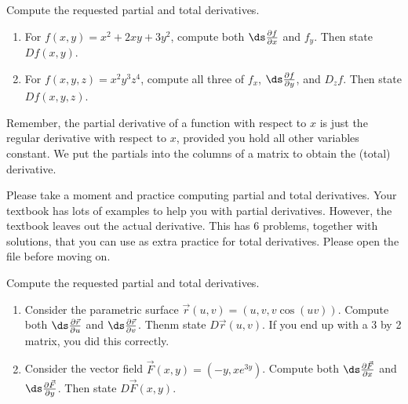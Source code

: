 \begin{problem}
%
Compute the requested partial and total derivatives.
\begin{enumerate}
 \item  For $f(x,y)=x^2+2xy+3y^2$, compute both $\ds\frac{\partial f}{\partial x}$ and $f_y$. Then state $Df(x,y)$. 
 \item  For $f(x,y,z)=x^2y^3z^4$, compute all three of $f_x$, $\ds\frac{\partial f}{\partial y}$, and $D_z f$. Then state $Df(x,y,z)$.
\end{enumerate}
Remember, the partial derivative of a function with respect to $x$ is just the regular derivative with respect to $x$, provided you hold all other variables constant. We put the partials into the columns of a matrix to obtain the (total) derivative.
\end{problem}

Please take a moment and practice computing partial and total derivatives.  Your textbook has lots of examples to help you with partial derivatives. However, the textbook leaves out the actual derivative.  This  has 6 problems, together with solutions, that you can use as extra practice for total derivatives. Please open the file before moving on.

\begin{problem}
Compute the requested partial and total derivatives.
\begin{enumerate}
 \item  Consider the parametric surface $\vec r(u,v) = (u,v,v\cos(uv))$. Compute both $\ds\frac{\partial \vec r}{\partial u}$ and $\ds\frac{\partial \vec r}{\partial v}$. Thenm state $D\vec r(u,v)$. If you end up with a 3 by 2 matrix, you did this correctly.
 \item  Consider the vector field $\vec F(x,y) = (-y,xe^{3y})$. Compute both $\ds\frac{\partial \vec F}{\partial x}$ and $\ds\frac{\partial \vec F}{\partial y}$. Then state $D\vec F(x,y)$. 
\end{enumerate}
\end{problem}

